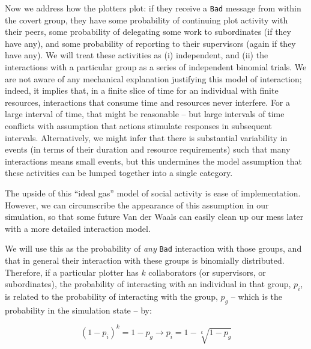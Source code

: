\documentclass{article}
\begin{document}
Now we address how the plotters plot: if they receive a \texttt{Bad} message from within the covert group, they have some probability of continuing plot activity with their peers, some probability of delegating some work to subordinates (if they have any), and some probability of reporting to their supervisors (again if they have any).  We will treat these activities as (i) independent, and (ii) the interactions with a particular group as a series of independent binomial trials.  We are not aware of any mechanical explanation justifying this model of interaction; indeed, it implies that, in a finite slice of time for an individual with finite resources, interactions that consume time and resources never interfere.  For a large interval of time, that might be reasonable -- but large intervals of time conflicts with assumption that actions stimulate responses in subsequent intervals.  Alternatively, we might infer that there is substantial variability in events (in terms of their duration and resource requirements) such that many interactions means small events, but this undermines the model assumption that these activities can be lumped together into a single category.

The upside of this ``ideal gas'' model of social activity is ease of implementation.  However, we can circumscribe the appearance of this assumption in our simulation, so that some future Van der Waals can easily clean up our mess later with a more detailed interaction model.

We will use this as the probability of {\em any} \texttt{Bad} interaction with those groups, and that in general their interaction with these groups is binomially distributed.  Therefore, if a particular plotter has $k$ collaborators (or supervisors, or subordinates), the probability of interacting with an individual in that group, $p_i$, is related to the probability of interacting with the group, $p_g$ -- which is the probability in the simulation state -- by:

$$
(1-p_i)^k = 1 - p_g \rightarrow p_i = 1-\sqrt[k]{1-p_g}
$$
\end{document}
